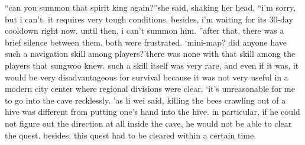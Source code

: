 “can you summon that spirit king again?”she said, shaking her head, “i’m sorry, but i can’t.
 it requires very tough conditions.
 besides, i’m waiting for its 30-day cooldown right now.
 until then, i can’t summon him.
”after that, there was a brief silence between them.
 both were frustrated.
‘mini-map? did anyone have such a navigation skill among players?’there was none with that skill among the players that sungwoo knew.
such a skill itself was very rare, and even if it was, it would be very disadvantageous for survival because it was not very useful in a modern city center where regional divisions were clear.
‘it’s unreasonable for me to go into the cave recklessly.
’as li wei said, killing the bees crawling out of a hive was different from putting one’s hand into the hive.
 in particular, if he could not figure out the direction at all inside the cave, he would not be able to clear the quest.
 besides, this quest had to be cleared within a certain time.

